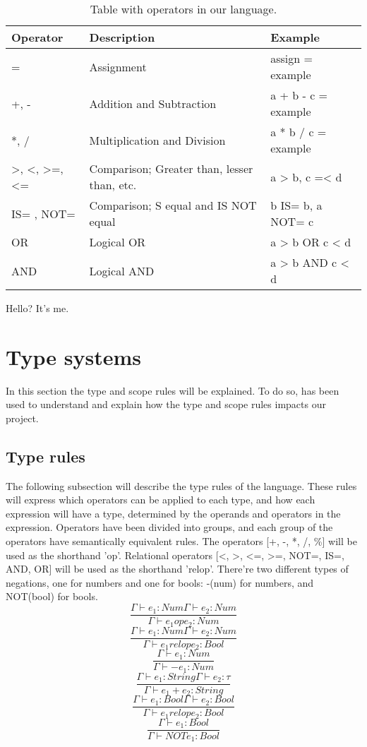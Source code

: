 \begin{table}[h]
	\centering
	\begin{tabular}{|l|l|l|}
		\hline
		Operator & Description & Example                \\ \hline
		=			& Assignment &  assign = example\\ \hline
		+, -		& Addition and Subtraction &  a + b - c = example \\ \hline
		*, /		& Multiplication and Division &  a * b / c = example\\ \hline
		>, <, >=, <= & Comparison; Greater than, lesser than, etc. & a > b, c =< d \\ \hline
		IS=	, NOT=	 &  Comparison; S equal and IS NOT equal & b IS= b, a NOT= c \\ \hline
		OR			& Logical OR & a > b OR c < d  \\ \hline
		AND		& Logical AND &	a > b AND c < d  \\ \hline
	\end{tabular}
	\caption{Table with operators in our language.}
	\label{fig:OperatorTable}
\end{table}
\begin{defi}
Hello? It's me.
\end{defi}

\section{Type systems}
In this section the type and scope rules will be explained. To do so, \cite{Sebesta} has been used to understand and explain how the type and scope rules impacts our project.

\subsection{Type rules}
The following subsection will describe the type rules of the language. These rules will express which operators can be applied to each type, and how each expression will have a type, determined by the operands and operators in the expression.
Operators have been divided into groups, and each group of the operators have semantically equivalent rules.
The operators [+, -, *, /, \%] will be used as the shorthand 'op'. Relational operators [<, >, <=, >=, NOT=, IS=, AND, OR] will be used as the shorthand 'relop'. There're two different types of negations, one for numbers and one for bools: -(num) for numbers, and NOT(bool) for bools.
\[
\dfrac{\Gamma \vdash e_1 : Num \Gamma \vdash e_2 : Num}{\Gamma \vdash e_1 op e_2 : Num}
\]
\[
\dfrac{\Gamma \vdash e_1 : Num \Gamma \vdash e_2 : Num}{\Gamma \vdash e_1 relop e_2 : Bool}
\]
\[
\dfrac{\Gamma \vdash e_1 : Num}{\Gamma \vdash -e_1 : Num}
\]
\[
\dfrac{\Gamma \vdash e_1 : String \Gamma \vdash e_2 : \tau}{\Gamma \vdash e_1 + e_2 : String}
\]
\[
\dfrac{\Gamma \vdash e_1 : Bool \Gamma \vdash e_2 : Bool}{\Gamma \vdash e_1 relop e_2 : Bool}
\]
\[
\dfrac{\Gamma \vdash e_1 : Bool}{\Gamma \vdash NOTe_1 : Bool}
\]
